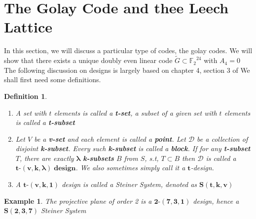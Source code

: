 \documentclass{article}
\newtheorem{definition}[theorem]{Definition}
\newtheorem{example}[theorem]{Example}
\numberwithin{equation}{theorem}
\numberwithin{figure}{theorem}
\newcommand{\GExtend}{\ensuremath{\widetilde{G}}}
\newcommand{\Ftwo}{\ensuremath{\mathbb{F}_2}}
\newcommand{\tCompleteDesign}{\ensuremath{\bm{t\mbox{-}(v,k,\lambda)\; design}}}
\begin{document}
\section{The Golay Code and thee Leech Lattice}\label{golaySection}
In this section, we will discuss a particular type of codes, the golay codes. We will show that there exists a unique doubly even linear code  $\GExtend \subset \Ftwo^{24}$ with $A_4 = 0$ 
The following discussion on designs is largely based on chapter 4, section 3 of \cite{roman1992coding}
We shall first need some definitions.
\begin{definition}\label{designDef} \hfill
	\begin{enumerate}
		\item A set with $t$ elements is called a \textbf{t-set}, a subset of a given set with $t$ elements is called a \textbf{t-subset}
		\item Let $V$ be a \textbf{v-set} and each element is called a \textbf{point}. Let $\mathscr{D}$ be a collection of disjoint \textbf{k-subset}. Every such \textbf{k-subset} is called a \textbf{block}. If for any \textbf{t-subset} $T$, there are exactly $\mathbf{\lambda}$ \textbf{k-subsets} $B$ from $S$, s.t, $T \subset B$ then $\mathscr{D}$ is called a \tCompleteDesign . We also sometimes simply call it a $\bm{t}$-design.
		\item A $\bm{t\mbox{-}(v,k,1)}$ design is called a \emph{Steiner System}, denoted as $\bm{S(t,k,v)}$
	\end{enumerate}
\end{definition}
\begin{example}\label{projPlane}
		The projective plane of order 2 is a $\bm{2\mbox{-}(7,3,1)}$ design, hence a $\bm{S(2,3,7)}$ \emph{Steiner System}
\end{example}
\end{document}

